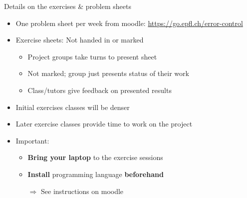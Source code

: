 \begin{frame}{Details on the exercises \& problem sheets}
    \begin{itemize}
        \item One problem sheet per week from moodle: \url{https://go.epfl.ch/error-control}
        \vspace{1em}
        \item Exercise sheets: Not handed in or marked
            \begin{itemize}
                \vspace{-0.3em}
                \item Project groups \alert{take turns to present sheet}
                \vspace{-0.3em}
                \item \alert{Not marked}; group just presents status of their work
                \vspace{-0.3em}
                \item Class/tutors give feedback on presented results
            \end{itemize}
        \vspace{1em}
        \item Initial exercises classes will be denser
        \vspace{-0.3em}
        \item Later exercise classes provide time to work on the project
        \vspace{1em}
    \item \alert{Important:}
        \begin{itemize}
            \vspace{-0.3em}
            \item \textbf{Bring your laptop} to the exercise sessions
            \vspace{-0.3em}
            \item \textbf{Install \julia} programming language \textbf{beforehand}
            \vspace{-0.3em}
            \item[$\Rightarrow$] See \alert{instructions on moodle}
        \end{itemize}
    \end{itemize}
\end{frame}

